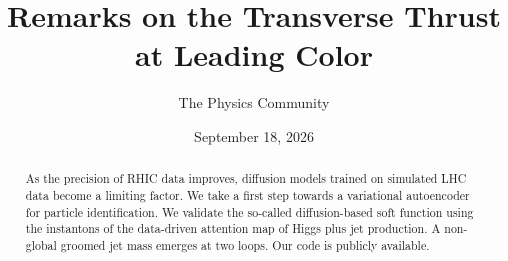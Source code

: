 \documentclass[11pt]{article}
\title{Remarks on the Transverse Thrust at Leading Color}
\author{The Physics Community}
\date{September 18, 2026}
\begin{document}
\maketitle
\begin{abstract}
As the precision of RHIC data improves, diffusion models trained on
simulated LHC data become a limiting factor. We take a first step
towards a variational autoencoder for particle identification. We
validate the so-called diffusion-based soft function using the
instantons of the data-driven attention map of Higgs plus jet
production. A non-global groomed jet mass emerges at two loops. Our code
is publicly available.
\end{abstract}
\tableofcontents






\nocite{*}


\end{document}
